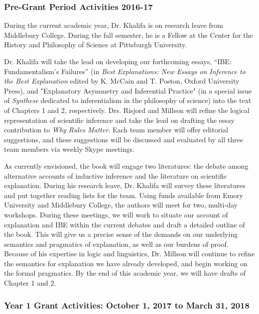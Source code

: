 \documentclass{article}[11pt]
\begin{document}
\subsubsection*{Pre-Grant Period Activities 2016-17}

During the current academic year, Dr. Khalifa is on research leave from Middlebury College.  During the fall semester, he is a Fellow at the Center for the History and Philosophy of Science at Pittsburgh University.  

Dr. Khalifa will take the lead on developing our forthcoming essays, ``IBE: Fundamentalism's Failures'' (in \textit{Best Explanations: New Essays on Inference to the Best Explanation} edited by K. McCain and T. Poston, Oxford University Press), and "Explanatory Asymmetry and Inferential Practice" (in a special issue of \textit{Synthese} dedicated to inferentialism in the philosophy of science) into the text of Chapters 1 and 2, respectively.  Drs. Risjord and Millson will refine the logical representation of scientific inference and take the lead on drafting the essay contribution to \textit{Why Rules Matter}.  Each team member will offer editorial suggestions, and these suggestions will be discussed and evaluated by all three team members via weekly Skype meetings.

As currently envisioned, the book will engage two literatures:  the debate among alternative accounts of inductive inference and the literature on scientific explanation. During his research leave, Dr. Khalifa will survey these literatures and put together reading lists for the team.  Using funds available from Emory University and Middlebury College, the authors will meet for two, multi-day workshops.  During these meetings, we will work to situate our account of explanation and IBE within the current debates and draft a detailed outline of the book.  This will give us a precise sense of the demands on our underlying semantics and pragmatics of explanation, as well as our burdens of proof. Because of his expertise in logic and linguistics, Dr. Millson will continue to refine the semantics for explanation we have already developed, and begin working on the formal pragmatics. By the end of this academic year, we will have drafts of Chapter 1 and 2.  

\subsubsection*{Year 1 Grant Activities: October 1, 2017 to March 31, 2018}
\end{document}
